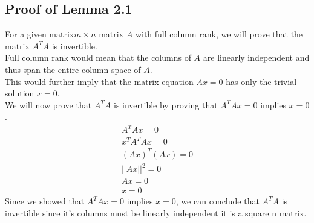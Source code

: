 \subsection{Proof of Lemma 2.1}
For a given matrix$m\times n$ matrix $A$ with full column rank, we will prove that the matrix $A^TA$ is invertible.\\
Full column rank would mean that the columns of $A$ are linearly independent and thus span the entire column space of $A$.\\
This would further imply that the matrix equation $Ax=0$ has only the trivial solution $x=0$.\\
We will now prove that $A^TA$ is invertible by proving that $A^TAx=0$ implies $x=0$.\\
\begin{eqnarray}
    A^TAx=0 \nonumber \\
    x^TA^TAx=0 \nonumber \\
    (Ax)^T(Ax)=0 \nonumber \\
    ||Ax||^2=0 \nonumber \\
    Ax=0 \nonumber \\
    x=0
\end{eqnarray}
Since we showed that $A^TAx=0$ implies $x=0$, we can conclude that $A^TA$ is invertible since it's columns must be linearly independent it is a square n matrix.\\

